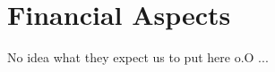 \chapter{Financial Aspects}\label{chap:financial_aspects_chapter}

No idea what they expect us to put here o.O ...



